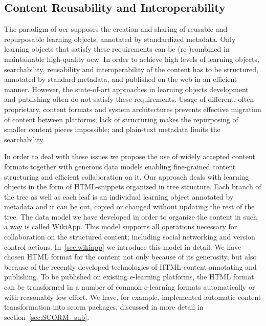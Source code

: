 \documentclass[PhD, Submit, ngerman,UKenglish,table]{scrbook}
\begin{document}
\subsection{Content Reusability and Interoperability}
\label{sec:content_reusability_structuring}
The paradigm of \gls{oer} supposes the creation and sharing of reusable and repurposable learning objects, annotated by standardized metadata.
Only learning objects that satisfy these requirements can be (re-)combined in maintainable high-quality \gls{ocw}.
In order to achieve high levels of learning objects, searchability, reusability and interoperability of the content has to be structured, annotated by standard metadata, and  published on the web in an efficient manner.
However, the state-of-art approaches in learning objects development and publishing often do not satisfy these requirements.
Usage of different, often proprietary, content formats and system architectures prevents effective migration of content between platforms; lack of structuring makes the repurposing of smaller content pieces impossible; and plain-text metadata limits the searchability.

In order to deal with these issues we propose the use of widely accepted content formats together with generous data models enabling fine-grained content structuring and efficient collaboration on it.
Our approach deals with learning objects in the form of HTML-snippets organized in tree structure.
Each branch of the tree as well as each leaf is an individual learning object annotated by metadata and it can be cut, copied or changed without updating the rest of the tree.
The data model we have developed in order to organize the content in such a way is called WikiApp.
This model supports all operations necessary for collaboration on the structured content; including social networking and version control actions.
In~\autoref{sec:wikiapp} we introduce this model in detail.
We have chosen HTML format for the content not only because of its generosity, but also because of the recently developed technologies of HTML-content annotating and publishing.
To be published on existing e-learning platforms, the HTML format can be transformed in a number of common e-learning formats automatically or with reasonably low effort.
We have, for example, implemented automatic content transformation into \gls{scorm} packages, discussed in more detail in section~\ref{sec:SCORM_sub}.
\end{document}
